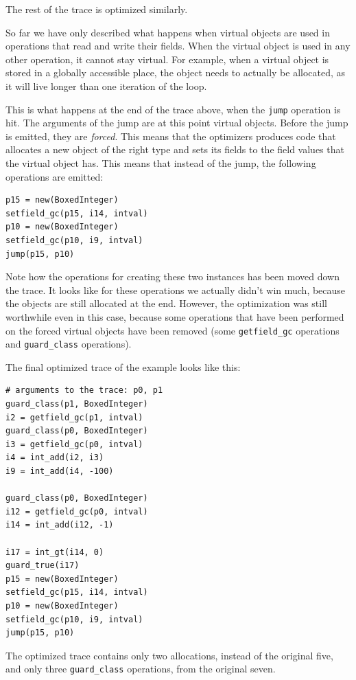 \documentclass{sigplanconf}
\begin{document}
The rest of the trace is optimized similarly.

So far we have only described what happens when virtual objects are used in
operations that read and write their fields. When the virtual object is used in
any other operation, it cannot stay virtual. For example, when a virtual object
is stored in a globally accessible place, the object needs to actually be
allocated, as it will live longer than one iteration of the loop.

This is what happens at the end of the trace above, when the \texttt{jump} operation
is hit. The arguments of the jump are at this point virtual objects. Before the
jump is emitted, they are \emph{forced}. This means that the optimizers produces code
that allocates a new object of the right type and sets its fields to the field
values that the virtual object has. This means that instead of the jump, the
following operations are emitted:

\begin{verbatim}
p15 = new(BoxedInteger)
setfield_gc(p15, i14, intval)
p10 = new(BoxedInteger)
setfield_gc(p10, i9, intval)
jump(p15, p10)
\end{verbatim}

Note how the operations for creating these two instances has been moved down the
trace. It looks like for these operations we actually didn't win much, because
the objects are still allocated at the end. However, the optimization was still
worthwhile even in this case, because some operations that have been performed
on the forced virtual objects have been removed (some \texttt{getfield\_gc} operations
and \texttt{guard\_class} operations).

The final optimized trace of the example looks like this:

\begin{verbatim}
# arguments to the trace: p0, p1
guard_class(p1, BoxedInteger)
i2 = getfield_gc(p1, intval)
guard_class(p0, BoxedInteger)
i3 = getfield_gc(p0, intval)
i4 = int_add(i2, i3)
i9 = int_add(i4, -100)

guard_class(p0, BoxedInteger)
i12 = getfield_gc(p0, intval)
i14 = int_add(i12, -1)

i17 = int_gt(i14, 0)
guard_true(i17)
p15 = new(BoxedInteger)
setfield_gc(p15, i14, intval)
p10 = new(BoxedInteger)
setfield_gc(p10, i9, intval)
jump(p15, p10)
\end{verbatim}

The optimized trace contains only two allocations, instead of the original five,
and only three \texttt{guard\_class} operations, from the original seven.
\end{document}
